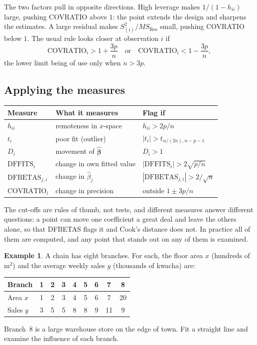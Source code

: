 \documentclass[11pt,a4paper]{article}
\numberwithin{equation}{section}
\theoremstyle{definition}
\newtheorem{exa}[thm]{Example}
\begin{document}
The two factors pull in opposite directions. High leverage makes $1/(1 - h_{ii})$ large,
pushing COVRATIO above $1$: the point extends the design and sharpens the estimates. A large
residual makes $S^2_{(i)}/MS_{\mathrm{Res}}$ small, pushing COVRATIO below $1$. The usual rule
looks closer at observation $i$ if
\[
\mathrm{COVRATIO}_i > 1 + \frac{3p}{n} \quad\text{or}\quad \mathrm{COVRATIO}_i < 1 - \frac{3p}{n} ,
\]
the lower limit being of use only when $n > 3p$.

\subsection{Applying the measures}
\begin{center}
\begin{tabular}{lll}
Measure & What it measures & Flag if \\
\hline
$h_{ii}$ & remoteness in $x$-space & $h_{ii} > 2p/n$ \\
$t_i$ & poor fit (outlier) & $|t_i| > t_{\alpha/(2n), n - p - 1}$ \\
$D_i$ & movement of $\hat{\boldsymbol\beta}$ & $D_i > 1$ \\
$\mathrm{DFFITS}_i$ & change in own fitted value & $|\mathrm{DFFITS}_i| > 2\sqrt{p/n}$ \\
$\mathrm{DFBETAS}_{j,i}$ & change in $\hat\beta_j$ & $|\mathrm{DFBETAS}_{j,i}| > 2/\sqrt{n}$ \\
$\mathrm{COVRATIO}_i$ & change in precision & outside $1 \pm 3p/n$ \\
\end{tabular}
\end{center}
The cut-offs are rules of thumb, not tests, and different measures answer different
questions: a point can move one coefficient a great deal and leave the others alone, so that
DFBETAS flags it and Cook's distance does not. In practice all of them are computed, and any
point that stands out on any of them is examined.

\begin{exa}\label{exa:shops}
A chain has eight branches. For each, the floor area $x$ (hundreds of m$^2$) and the
average weekly sales $y$ (thousands of kwacha) are:
\begin{center}
\begin{tabular}{l|cccccccc}
Branch & 1 & 2 & 3 & 4 & 5 & 6 & 7 & 8 \\
\hline
Area $x$ & 1 & 2 & 3 & 4 & 5 & 6 & 7 & 20 \\
Sales $y$ & 3 & 5 & 5 & 8 & 8 & 9 & 11 & 9 \\
\end{tabular}
\end{center}
Branch~8 is a large warehouse store on the edge of town. Fit a straight line and examine the
influence of each branch.
\end{exa}
\end{document}
